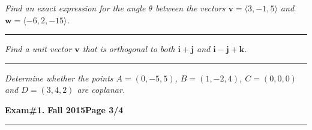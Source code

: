 \documentclass[12pt]{article}
\begin{document}
{\problem[10 pts] \em Find an exact expression for the angle $\theta$ between
the vectors $\boldsymbol{v}=\langle 3, -1, 5\rangle$ and
$\boldsymbol{w}=\langle -6, 2, -15\rangle$.} 
\vspace{2cm}
\begin{flushright}
\end{flushright}
\hrule

{\problem[15 pts] \em Find a unit vector $\boldsymbol{v}$ that is orthogonal
to both $\boldsymbol{i} + \boldsymbol{j}$ and $\boldsymbol{i} - \boldsymbol{j} +
\boldsymbol{k}$.} 
\vspace{4cm}
\begin{flushright}
\end{flushright}
\hrule

{\problem[15 pts] \em Determine whether the points $A=(0,-5,5)$, $ B=
(1,-2,4)$, $C=(0,0,0)$ and $D=(3,4,2)$ are coplanar.}
\newpage

\hfill{\large\bf Exam\#1.}\hfill{\large\bf
  Fall 2015}\hfill{\large\bf Page 3/4}\hrule
\end{document}
